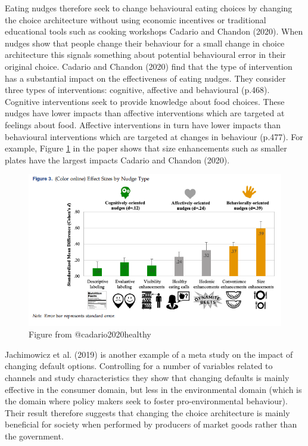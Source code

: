 \documentclass[
]{book}
\begin{document}
Eating nudges therefore seek to change behavioural eating choices by changing the choice architecture without using economic incentives or traditional educational tools such as cooking workshops Cadario and Chandon (2020). When nudges show that people change their behaviour for a small change in choice architecture this signals something about potential behavioural error in their original choice. Cadario and Chandon (2020) find that the type of intervention has a substantial impact on the effectiveness of eating nudges. They consider three types of interventions: cognitive, affective and behavioural (p.468). Cognitive interventions seek to provide knowledge about food choices. These nudges have lower impacts than affective interventions which are targeted at feelings about food. Affective interventions in turn have lower impacts than behavioural interventions which are targeted at changes in behaviour (p.477). For example, Figure \ref{fig:cadario} in the paper shows that size enhancements such as smaller plates have the largest impacts Cadario and Chandon (2020).

\begin{figure}
\includegraphics[width=9.58in]{./figures/cadario} \caption{Figure from @cadario2020healthy}\label{fig:cadario}
\end{figure}

Jachimowicz et al. (2019) is another example of a meta study on the impact of changing default options. Controlling for a number of variables related to channels and study characteristics they show that changing defaults is mainly effective in the consumer domain, but less in the environmental domain (which is the domain where policy makers seek to foster pro-environmental behaviour). Their result therefore suggests that changing the choice architecture is mainly beneficial for society when performed by producers of market goods rather than the government.
\end{document}
